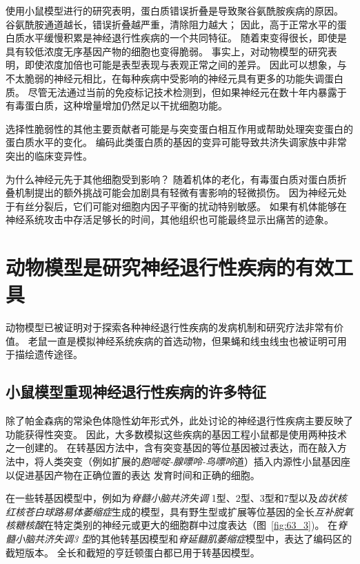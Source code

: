 使用小鼠模型进行的研究表明，蛋白质错误折叠是导致聚谷氨酰胺疾病的原因。
谷氨酰胺通道越长，错误折叠越严重，清除阻力越大；
因此，高于正常水平的蛋白质水平缓慢积累是神经退行性疾病的一个共同特征。
随着束变得很长，即使是具有较低浓度无序基因产物的细胞也变得脆弱。
事实上，对动物模型的研究表明，即使浓度加倍也可能是表型表现与表观正常之间的差异。
因此可以想象，与不太脆弱的神经元相比，在每种疾病中受影响的神经元具有更多的功能失调蛋白质。
尽管无法通过当前的免疫标记技术检测到，但如果神经元在数十年内暴露于有毒蛋白质，这种增量增加仍然足以干扰细胞功能。


选择性脆弱性的其他主要贡献者可能是与突变蛋白相互作用或帮助处理突变蛋白的蛋白质水平的变化。
编码此类蛋白质的基因的变异可能导致共济失调家族中非常突出的临床变异性。


为什么神经元先于其他细胞受到影响？
随着机体的老化，有毒蛋白质对蛋白质折叠机制提出的额外挑战可能会加剧具有轻微有害影响的轻微损伤。
因为神经元处于有丝分裂后，它们可能对细胞内因子平衡的扰动特别敏感。
如果有机体能够在神经系统攻击中存活足够长的时间，其他组织也可能最终显示出痛苦的迹象。



\section{动物模型是研究神经退行性疾病的有效工具}

动物模型已被证明对于探索各种神经退行性疾病的发病机制和研究疗法非常有价值。
老鼠一直是模拟神经系统疾病的首选动物，但果蝇和线虫线虫也被证明可用于描绘遗传途径。



\subsection{小鼠模型重现神经退行性疾病的许多特征}

除了帕金森病的常染色体隐性幼年形式外，此处讨论的神经退行性疾病主要反映了功能获得性突变。
因此，大多数模拟这些疾病的基因工程小鼠都是使用两种技术之一创建的。
在转基因方法中，含有突变基因的等位基因被过表达，而在敲入方法中，将人类突变（例如扩展的\textit{胞嘧啶-腺嘌呤-鸟嘌呤}道）插入内源性小鼠基因座以促进基因产物在正确位置的表达 发育时间和正确的细胞。


在一些转基因模型中，例如为\textit{脊髓小脑共济失调} 1型、2型、3型和7型以及\textit{齿状核红核苍白球路易体萎缩症}生成的模型，具有野生型或扩展等位基因的全长\textit{互补脱氧核糖核酸}在特定类别的神经元或更大的细胞群中过度表达（图~\ref{fig:63_3})。
在\textit{脊髓小脑共济失调3 型}的其他转基因模型和\textit{脊延髓肌萎缩症}模型中，表达了编码区的截短版本。
全长和截短的亨廷顿蛋白都已用于转基因模型。


